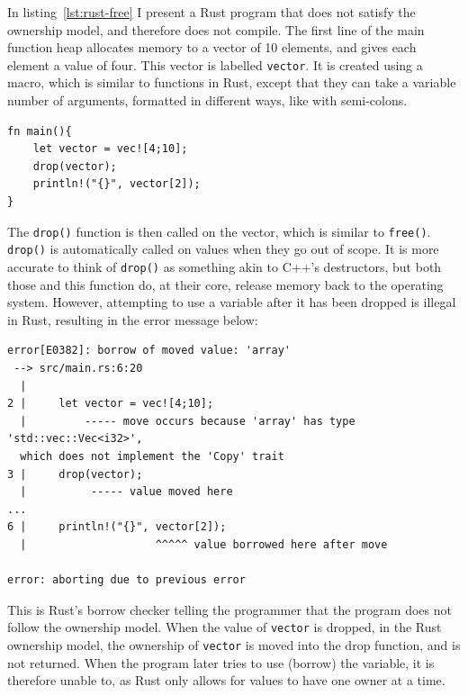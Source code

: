 In listing~\ref{lst:rust-free} I present a Rust program that does not satisfy the ownership model, and therefore does not compile. The first line of the main function heap allocates memory to a vector of 10 elements, and gives each element a value of four. This vector is labelled \texttt{vector}. It is created using a macro, which is similar to functions in Rust, except that they can take a variable number of arguments, formatted in different ways, like with semi-colons.

\begin{code}
\begin{verbatim}
fn main(){
    let vector = vec![4;10];
    drop(vector);
    println!("{}", vector[2]);
}
\end{verbatim}
\label{lst:rust-free}
\end{code}

The \texttt{drop()} function is then called on the vector, which is similar to \texttt{free()}. \texttt{drop()} is automatically called on values when they go out of scope. It is more accurate to think of \texttt{drop()} as something akin to C++'s destructors, but both those and this function do, at their core, release memory back to the operating system. However, attempting to use a variable after it has been dropped is illegal in Rust, resulting in the error message below:

\begin{code}
\begin{verbatim}
error[E0382]: borrow of moved value: 'array'
 --> src/main.rs:6:20
  |
2 |     let vector = vec![4;10];
  |         ----- move occurs because 'array' has type 'std::vec::Vec<i32>',
  which does not implement the 'Copy' trait
3 |     drop(vector);
  |          ----- value moved here
...
6 |     println!("{}", vector[2]);
  |                    ^^^^^ value borrowed here after move

error: aborting due to previous error
\end{verbatim}
\label{lst:rust-borrow-move}
\end{code}

This is Rust's borrow checker telling the programmer that the program does not follow the ownership model. When the value of \texttt{vector} is dropped, in the Rust ownership model, the ownership of \texttt{vector} is moved into the drop function, and is not returned.
When the program later tries to use (borrow) the variable, it is therefore unable to, as Rust only allows for values to have one owner at a time.


